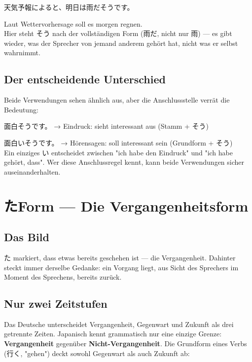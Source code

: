 \documentclass[12pt]{book}
\begin{document}
\par\quad 天気予報によると、明日は雨だそうです。\\
\par\quad Laut Wettervorhersage soll es morgen regnen.\\

Hier steht そう nach der vollständigen Form (雨だ, nicht nur 雨) — es gibt wieder, was der Sprecher von jemand anderem gehört hat, nicht was er selbst wahrnimmt.

\section*{Der entscheidende Unterschied}

Beide Verwendungen sehen ähnlich aus, aber die Anschlussstelle verrät die Bedeutung:

\par\quad 面白そうです。 → Eindruck: sieht interessant aus (Stamm + そう)\\
\par\quad 面白いそうです。 → Hörensagen: soll interessant sein (Grundform + そう)\\

Ein einziges い entscheidet zwischen "ich habe den Eindruck" und "ich habe gehört, dass". Wer diese Anschlussregel kennt, kann beide Verwendungen sicher auseinanderhalten.


\chapter{たForm — Die Vergangenheitsform}

\section*{Das Bild}

た markiert, dass etwas bereits geschehen ist — die Vergangenheit. Dahinter steckt immer derselbe Gedanke: ein Vorgang liegt, aus Sicht des Sprechers im Moment des Sprechens, bereits zurück.

\section*{Nur zwei Zeitstufen}

Das Deutsche unterscheidet Vergangenheit, Gegenwart und Zukunft als drei getrennte Zeiten. Japanisch kennt grammatisch nur eine einzige Grenze: \textbf{Vergangenheit} gegenüber \textbf{Nicht-Vergangenheit}. Die Grundform eines Verbs (行く, "gehen") deckt sowohl Gegenwart als auch Zukunft ab:
\end{document}
